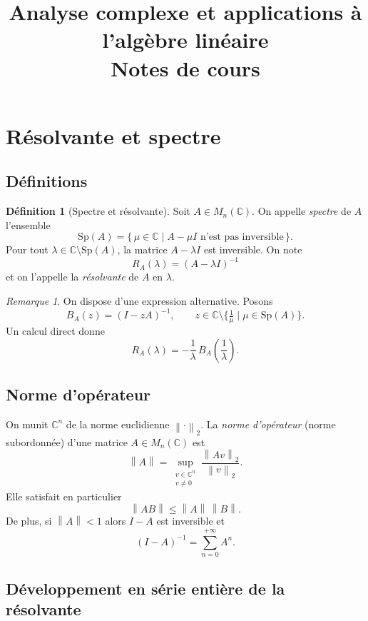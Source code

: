\documentclass[12pt,a4paper]{article}
\title{\textbf{Analyse complexe et applications à l'algèbre linéaire}\\[0.5em]
       \large Notes de cours}
\author{}
\date{}
\theoremstyle{definition}
\newtheorem{definition}{Définition}[section]
\theoremstyle{plain}
\theoremstyle{remark}
\newtheorem{remarque}{Remarque}[section]
\newcommand{\CC}{\mathbb{C}}
\newcommand{\Sp}{\mathrm{Sp}}
\newcommand{\norm}[1]{\left\|#1\right\|}
\begin{document}
\maketitle
\tableofcontents
\newpage

\section{Résolvante et spectre}

\subsection{Définitions}

\begin{definition}[Spectre et résolvante]
Soit $A \in M_n(\CC)$. On appelle \emph{spectre} de $A$ l'ensemble
\[
  \Sp(A) = \{\, \mu \in \CC \mid A - \mu I \text{ n'est pas inversible}\,\}.
\]
Pour tout $\lambda \in \CC \setminus \Sp(A)$, la matrice $A - \lambda I$ est inversible.
On note
\[
  R_A(\lambda) = (A - \lambda I)^{-1}
\]
et on l'appelle la \emph{résolvante} de $A$ en $\lambda$.
\end{definition}

\begin{remarque}
On dispose d'une expression alternative. Posons
\[
  B_A(z) = (I - zA)^{-1}, \qquad z \in \CC \setminus \bigl\{\tfrac{1}{\mu} \mid \mu \in \Sp(A)\bigr\}.
\]
Un calcul direct donne
\[
  R_A(\lambda) = -\frac{1}{\lambda}\, B_A\!\left(\frac{1}{\lambda}\right).
\]
\end{remarque}

\subsection{Norme d'opérateur}

On munit $\CC^n$ de la norme euclidienne $\norm{\cdot}_2$. La \emph{norme d'opérateur}
(norme subordonnée) d'une matrice $A \in M_n(\CC)$ est
\[
  \norm{A} = \sup_{\substack{v \in \CC^n \\ v \neq 0}} \frac{\norm{Av}_2}{\norm{v}_2}.
\]
Elle satisfait en particulier
\[
  \norm{AB} \leq \norm{A}\,\norm{B}.
\]
De plus, si $\norm{A} < 1$ alors $I - A$ est inversible et
\[
  (I-A)^{-1} = \sum_{n=0}^{+\infty} A^n.
\]

\subsection{Développement en série entière de la résolvante}
\end{document}
